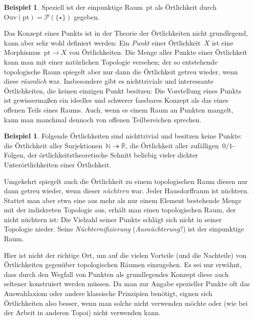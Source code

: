 \documentclass[a4paper,ngerman,12pt]{scrartcl}
\theoremstyle{definition}
\newtheorem{bsp}[defn]{Beispiel}
\theoremstyle{plain}
\theoremstyle{remark}
\newcommand{\RR}{\mathbb{R}}
\newcommand{\NN}{\mathbb{N}}
\renewcommand{\P}{\mathcal{P}}
\newcommand{\Ouv}{\mathrm{Ouv}}
\newcommand{\pt}{\mathrm{pt}}
\renewcommand{\_}{\mathpunct{.}\,}
\newcommand{\?}{\,{:}\,}
\begin{document}
\begin{bsp}Speziell ist der einpunktige Raum~$\pt$ als Örtlichkeit
durch~$\Ouv(\pt) = \P(\{\star\})$ gegeben.\end{bsp}

Das Konzept eines Punkts ist in der Theorie der Örtlichkeiten nicht
grundlegend, kann aber sehr wohl definiert werden: Ein \emph{Punkt} einer
Örtlichkeit~$X$ ist eine Morphismus~$\pt \to X$ von Örtlichkeiten. Die Menge
aller Punkte einer Örtlichkeit kann man mit einer natürlichen Topologie
versehen; der so entstehende topologische Raum spiegelt aber nur dann die
Örtlichkeit getreu wieder, wenn diese \emph{räumlich} war. Insbesondere gibt es
nichttriviale und interessante Örtlichkeiten, die keinen einzigen Punkt
besitzen: Die Vorstellung eines Punkts ist gewissermaßen ein ideelles und
schwerer fassbares Konzept als das eines offenen Teils eines Raums. Auch, wenn
es einem Raum an Punkten mangelt, kann man manchmal dennoch von offenen
Teilbereichen sprechen.

\begin{bsp}Folgende Örtlichkeiten sind nichttrivial und besitzen keine Punkte:
die Örtlichkeit aller Surjektionen~$\NN \twoheadrightarrow \RR$, die
Örtlichkeit aller zufälligen~$0/1$-Folgen, der örtlichkeitstheoretische Schnitt
beliebig vieler dichter Unterörtlichkeiten einer Örtlichkeit.\end{bsp}

Umgekehrt spiegelt auch die Örtlichkeit zu einem topologischen Raum diesen nur
dann getreu wieder, wenn dieser \emph{nüchtern} war. Jeder Hausdorffraum ist
nüchtern.
Stattet man aber etwa eine aus mehr als nur einem Element bestehende Menge 
mit der indiskreten Topologie aus, erhält man einen
topologischen Raum, der nicht nüchtern ist: Die Vielzahl seiner Punkte schlägt
sich nicht in seiner Topologie nieder. Seine \emph{Nüchternifizierung}
(\emph{Ausnüchterung}?) ist der einpunktige Raum.

Hier ist nicht der richtige Ort, um auf die vielen Vorteile (und die Nachteile) von
Örtlichkeiten gegenüber topologischen Räumen einzugehen. Es sei nur erwähnt,
dass durch den Wegfall von Punkten als grundlegendes Konzept diese auch
seltener konstruiert werden müssen. Da man zur Angabe spezieller Punkte oft das
Auswahlaxiom oder andere klassische Prinzipien benötigt, eignen sich
Örtlichkeiten also besser, wenn man solche nicht verwenden möchte oder (wie bei
der Arbeit in anderen Topoi) nicht verwenden kann.
\end{document}
